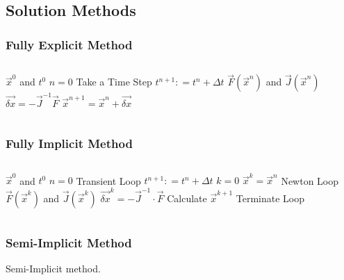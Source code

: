 \documentclass[compress,xcolor=table]{beamer}
\begin{document}
\subsection[Solution Methods]{Solution Methods}
\begin{frame}
\frametitle{Fully Explicit Method}

\begin{columns}


\begin{algorithmic}
\scriptsize
\Require $\vec{x}^{0}$ and $t^{0}$
\Set $n = 0$
\Loop \; Take a Time Step
    \Set $t^{n+1} : = t^{n} + \Delta t$
    \Calculate $\vec{F}(\vec{x}^n)$ and $\vec{J}(\vec{x}^n)$
    \Calculate $\vec{\delta x} = -\vec{J}^{-1}\vec{F}$
    \Calculate $\vec{x}^{n+1} = \vec{x}^{n} + \vec{\delta x}$ 
\end{algorithmic}

\end{columns}

\end{frame}
\begin{frame}
\frametitle{Fully Implicit Method}
\begin{columns}

\begin{algorithmic}
\scriptsize
\Require $\vec{x}^{0}$ and $t^{0}$
\Set $n = 0$
\Loop \; Transient Loop
    \Set $t^{n+1} : = t^{n} + \Delta t$
    \Set $k = 0$
    \Set $\vec{x}^{k} = \vec{x}^{n}$
    \Loop \; Newton Loop
		\Calculate $\vec{F}(\vec{x}^{k})$ and $\vec{J}(\vec{x}^{k})$
		\Calculate $\vec{\delta x}^k = - \vec{J}^{-1}\cdot\vec{F}$
		\BlackBox Calculate $\vec{x}^{k+1}$
		\BlackBox Terminate Loop
\end{algorithmic}


\end{columns}
\end{frame}
\begin{frame}
\frametitle{Semi-Implicit Method}

Semi-Implicit method.

\end{frame}
\end{document}
